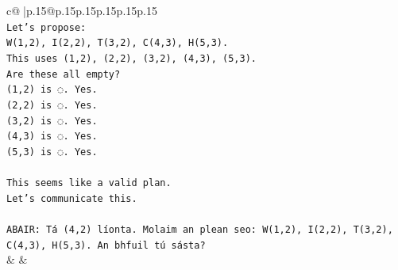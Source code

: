 \documentclass{article}
\begin{document}
{\begin{supertabular}{c@{$\;$}|p{.15\linewidth}@{}p{.15\linewidth}p{.15\linewidth}p{.15\linewidth}p{.15\linewidth}p{.15\linewidth}}
{{{\\ 
\texttt{Let's propose:} \\
\texttt{W(1,2), I(2,2), T(3,2), C(4,3), H(5,3).} \\
\texttt{This uses (1,2), (2,2), (3,2), (4,3), (5,3).} \\
\texttt{Are these all empty?} \\
\texttt{(1,2) is ◌. Yes.} \\
\texttt{(2,2) is ◌. Yes.} \\
\texttt{(3,2) is ◌. Yes.} \\
\texttt{(4,3) is ◌. Yes.} \\
\texttt{(5,3) is ◌. Yes.} \\
\\ 
\texttt{This seems like a valid plan.} \\
\texttt{Let's communicate this.} \\
\\ 
\texttt{ABAIR: Tá (4,2) líonta. Molaim an plean seo: W(1,2), I(2,2), T(3,2), C(4,3), H(5,3). An bhfuil tú sásta?} \\
            }
        }
    }
    & & \\ \\


\end{supertabular}}
\end{document}
